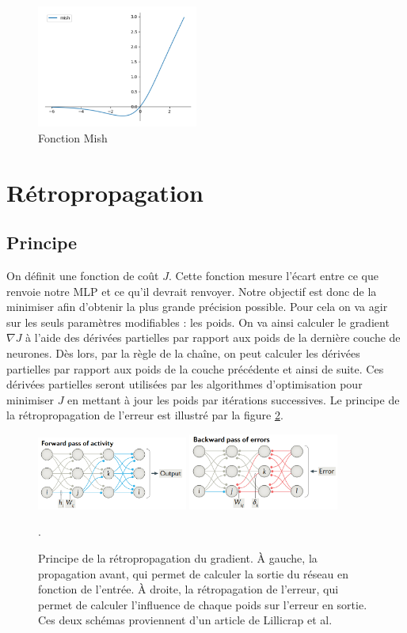 \begin{figure}[!h]
\centering
\includegraphics[width=150pt]{"images/MLP/mish2"}
\caption{Fonction Mish}
\label{Mish}
\end{figure}


\section{Rétropropagation}
\subsection{Principe}

On définit une fonction de coût $J$. Cette fonction mesure l'écart entre ce que renvoie notre MLP et ce qu'il devrait renvoyer. Notre objectif est donc de la minimiser afin d'obtenir la plus grande précision possible. Pour cela on va agir sur les seuls paramètres modifiables : les poids. On va ainsi calculer le gradient $\nabla J$ à l'aide des dérivées partielles par rapport aux poids de la dernière couche de neurones. Dès lors, par la règle de la chaîne, on peut calculer les dérivées partielles par rapport aux poids de la couche précédente et ainsi de suite. Ces dérivées partielles seront utilisées par les algorithmes d'optimisation pour minimiser $J$ en mettant à jour les poids par itérations successives. Le principe de la rétropropagation de l'erreur est illustré par la figure \ref{backward}.

\begin{figure}[!h]
\centering
\includegraphics[width=140pt]{"images/MLP/forward"}
\hspace*{5mm}
\includegraphics[width=140pt]{"images/MLP/backward"}
\caption{Principe de la rétropropagation du gradient. À gauche, la propagation avant, qui permet de calculer la sortie du réseau en fonction de l'entrée. À droite, la rétropagation de l'erreur, qui permet de calculer l'influence de chaque poids sur l'erreur en sortie. Ces deux schémas proviennent d'un article de Lillicrap et al. \cite{lillicrap_backpropagation_2020}}.
\label{backward}
\end{figure}

